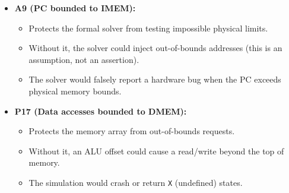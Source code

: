 \documentclass[11pt]{article}
\begin{document}
\begin{itemize}
    \item \textbf{A9 (PC bounded to IMEM):} 
    \begin{itemize}
        \item Protects the formal solver from testing impossible physical limits.
        \item Without it, the solver could inject out-of-bounds addresses (this is an assumption, not an assertion).
        \item The solver would falsely report a hardware bug when the PC exceeds physical memory bounds.
    \end{itemize}

    \item \textbf{P17 (Data accesses bounded to DMEM):} 
    \begin{itemize}
        \item Protects the memory array from out-of-bounds requests.
        \item Without it, an ALU offset could cause a read/write beyond the top of memory.
        \item The simulation would crash or return \texttt{X} (undefined) states.
    \end{itemize}
\end{itemize}
\end{document}
